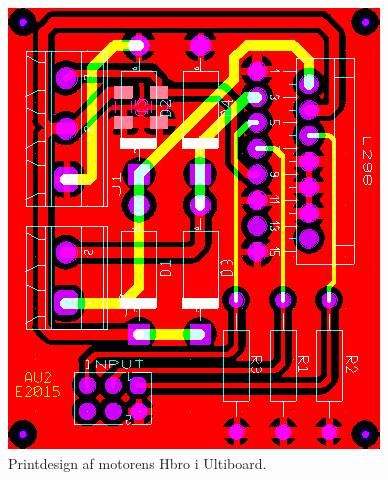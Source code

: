 \begin{figure}[h]
\centering
\includegraphics[scale=1]{../fig/billeder/hbro_ultiboard.png}
\caption{Printdesign af motorens Hbro i Ultiboard.}
\label{fig:hbro_ultiboard}
\end{figure}

